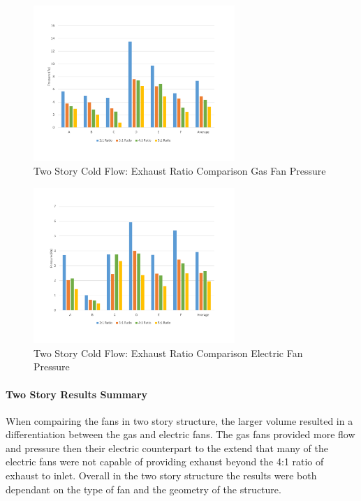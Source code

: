 \documentclass{article}
\begin{document}
\begin{figure}[H]
	\centering
	\includegraphics[width=3in]{0_Images/ColdFlow/Two_Story/RatioPressureGas.pdf}
	\caption{Two Story Cold Flow: Exhaust Ratio Comparison Gas Fan Pressure}
	\label{fig:RatioPressure2StoryGas}
\end{figure}

\begin{figure}[H]
	\centering
	\includegraphics[width=3in]{0_Images/ColdFlow/Two_Story/RatioPressureEle.pdf}
	\caption{Two Story Cold Flow: Exhaust Ratio Comparison Electric Fan Pressure}
	\label{fig:RatioPressure2StoryEle}
\end{figure}

\paragraph{Two Story Results Summary} \mbox{}

When compairing the fans in two story structure, the larger volume resulted in a differentiation between the gas and electric fans. The gas fans provided more flow and pressure then their electric counterpart to the extend that many of the electric fans were not capable of providing exhaust beyond the 4:1 ratio of exhaust to inlet. Overall in the two story structure the results were both dependant on the type of fan and the geometry of the structure.
\end{document}

